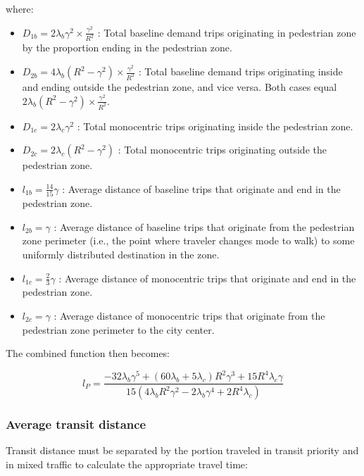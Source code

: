 \documentclass{elsarticle}\usepackage[]{graphicx}\usepackage[]{color}
\begin{document}
    where: 
    \begin{itemize}
        \item $D_{1b} = 2 \lambda_b \gamma^2 \times \frac{\gamma^2}{R^2}$ : Total baseline demand trips originating in pedestrian zone by the proportion ending in the pedestrian zone.
        \item $D_{2b} = 4 \lambda_b (R^2 - \gamma^2) \times \frac{\gamma^2}{R^2}$ : Total baseline demand trips originating inside and ending outside the pedestrian zone, and vice versa. Both cases equal $2\lambda_b (R^2 - \gamma^2) \times \frac{\gamma^2}{R^2}$.
        \item $D_{1c} = 2 \lambda_c \gamma^2$ : Total monocentric trips originating inside the pedestrian zone.
        \item $D_{2c} = 2 \lambda_c (R^2 - \gamma^2)$ : Total monocentric trips originating outside the pedestrian zone.
        \item $l_{1b} = \frac{14}{15}\gamma$ : Average distance of baseline trips that originate and end in the pedestrian zone.
        \item $l_{2b} = \gamma$ : Average distance of baseline trips that originate from the pedestrian zone perimeter (i.e., the point where traveler changes mode to walk) to some uniformly distributed destination in the zone.
        \item $l_{1c} = \frac{2}{3}\gamma$ : Average distance of monocentric trips that originate and end in the pedestrian zone.
        \item $l_{2c} = \gamma$ : Average distance of monocentric trips that originate from the pedestrian zone perimeter to the city center.
    \end{itemize}
    
    The combined function then becomes:
    
    \begin{equation}
    l_{P}=\frac{-32\lambda_{b}\gamma^{5}+\left(60\lambda_{b}+5\lambda_{c}\right)R^{2}\gamma^{3}+15R^{4}\lambda_{c}\gamma}{15\left(4\lambda_{b}R^{2}\gamma^{2}-2\lambda_{b}\gamma^{4}+2R^{4}\lambda_{c}\right)}
    \end{equation}

\subsubsection{Average transit distance}
    Transit distance must be separated by the portion traveled in transit priority and in mixed traffic to calculate the appropriate travel time:
    
\end{document}
